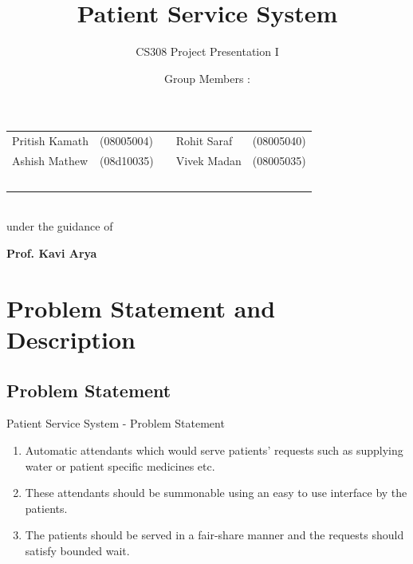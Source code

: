 \documentclass{beamer}
\title[Patient Service System]{Patient Service System}
\author {CS308 Project Presentation I}
\date{Group Members :}
\begin{document}
\begin{frame}
\titlepage
\begin{center}
\medskip
\begin{tabular}{lllll}
Pritish Kamath & (08005004) & & Rohit Saraf &  (08005040) \\
Ashish Mathew  &  (08d10035) & & Vivek Madan &  (08005035)\\\
\end{tabular}\\
under the guidance of\\
\begin{large}
\textbf{Prof. Kavi Arya}
\end{large}
\end{center}
\end{frame}


\section{Problem Statement and Description}
\subsection{Problem Statement}
\begin{frame}{Patient Service System - Problem Statement}
\begin{enumerate}
\item Automatic attendants which would serve patients' requests such as supplying water or patient specific medicines etc.
\item These attendants should be summonable using an easy to use interface by the patients.
\item The patients should be served in a fair-share manner and the requests should satisfy bounded wait.
\end{enumerate}
\end{frame}
\end{document}
